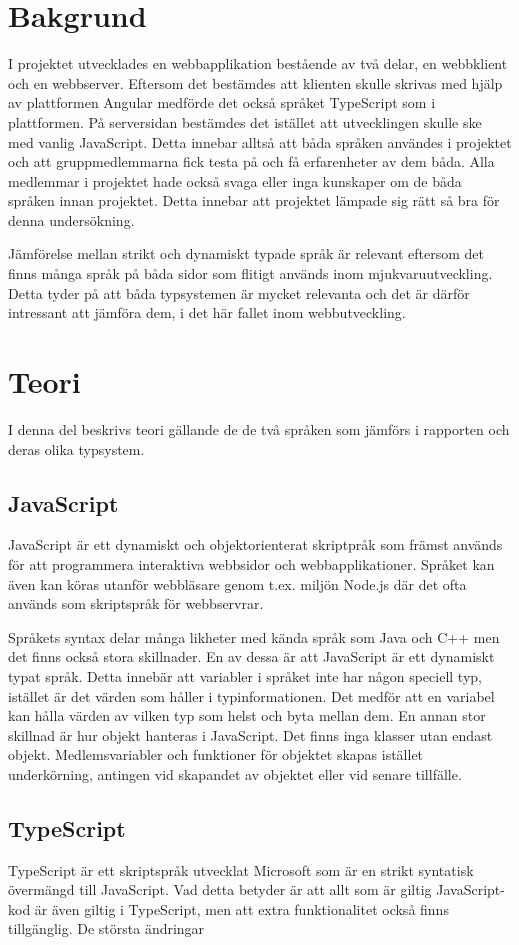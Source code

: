 \section{Bakgrund}
I projektet utvecklades en webbapplikation bestående av två delar, en webbklient och en webbserver. Eftersom det bestämdes att klienten skulle skrivas med hjälp av plattformen Angular medförde det också språket TypeScript som i plattformen. På serversidan bestämdes det istället att utvecklingen skulle ske med vanlig JavaScript. Detta innebar alltså att båda språken användes i projektet och att gruppmedlemmarna fick testa på och få erfarenheter av dem båda. Alla medlemmar i projektet hade också svaga eller inga kunskaper om de båda språken innan projektet. Detta innebar att projektet lämpade sig rätt så bra för denna undersökning.

Jämförelse mellan strikt och dynamiskt typade språk är relevant eftersom det finns många språk på båda sidor som flitigt används inom mjukvaruutveckling. Detta tyder på att båda typsystemen är mycket relevanta och det är därför intressant att jämföra dem, i det här fallet inom webbutveckling.
\section{Teori}
I denna del beskrivs teori gällande de de två språken som jämförs i rapporten och deras olika typsystem.
\subsection{JavaScript}
JavaScript är ett dynamiskt och objektorienterat skriptpråk som främst används för att programmera interaktiva webbsidor och webbapplikationer. Språket kan även kan köras utanför webbläsare genom t.ex. miljön Node.js där det ofta används som skriptspråk för webbservrar.\cite{henrik_js1}

Språkets syntax delar många likheter med kända språk som Java och C++ men det finns också stora skillnader. En av dessa är att JavaScript är ett dynamiskt typat språk. Detta innebär att variabler i språket inte har någon speciell typ, istället är det värden som håller i typinformationen. Det medför att en variabel kan hålla värden av vilken typ som helst och byta mellan dem.\cite{henrik_js2} En annan stor skillnad är hur objekt hanteras i JavaScript. Det finns inga klasser utan endast objekt. Medlemsvariabler och funktioner för objektet skapas istället underkörning, antingen vid skapandet av objektet eller vid senare tillfälle.\cite{henrik_js3}
\subsection{TypeScript}
TypeScript är ett skriptspråk utvecklat Microsoft som är en strikt syntatisk övermängd till JavaScript. Vad detta betyder är att allt som är giltig JavaScript-kod är även giltig i TypeScript, men att extra funktionalitet också finns tillgänglig. De största ändringar
